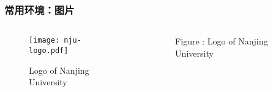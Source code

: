 \begin{frame}[fragile]
\frametitle{常用环境：图片}
\begin{columns}
\begin{column}{0.6\textwidth}
  \begin{texcode}[gobble=4, moretexcs={\graphicspath,\includegraphics},
      emph={[1]figure}, emph={[2]graphicx}]
    \usepackage{graphicx}
    \graphicspath{{./images/}}

    \begin{figure}
      \centering
      \texttt{[image: nju-logo.pdf]}
      \caption{Logo of Nanjing University}
      \label{fig:nju-logo}
    \end{figure}
  \end{texcode}
\end{column}
\pause
\begin{column}{0.3\textwidth}
  \begin{figure}
    \centering
    \caption{\textcolor{keyword}{Figure \thefigure:} Logo of Nanjing University}
    \label{fig:nju-logo_}  %
  \end{figure}
\end{column}
\end{columns}
\end{frame}

